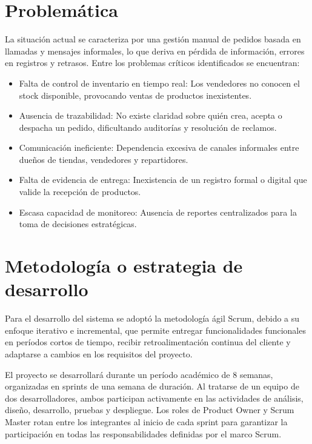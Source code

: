 \documentclass[12pt,a4paper]{report}
\begin{document}
\section{Problemática}
La situación actual se caracteriza por una gestión manual de pedidos basada en llamadas y mensajes informales, lo que deriva en pérdida de información, errores en registros y retrasos. Entre los problemas críticos identificados se encuentran:
\begin{itemize}
\item Falta de control de inventario en tiempo real: Los vendedores no conocen el stock disponible, provocando ventas de productos inexistentes.

\item Ausencia de trazabilidad: No existe claridad sobre quién crea, acepta o despacha un pedido, dificultando auditorías y resolución de reclamos.

\item Comunicación ineficiente: Dependencia excesiva de canales informales entre dueños de tiendas, vendedores y repartidores.

\item Falta de evidencia de entrega: Inexistencia de un registro formal o digital que valide la recepción de productos.

\item Escasa capacidad de monitoreo: Ausencia de reportes centralizados para la toma de decisiones estratégicas.
\end{itemize}

\section{Metodología o estrategia de desarrollo}
Para el desarrollo del sistema se adoptó la metodología ágil Scrum, debido a su enfoque iterativo e incremental, que permite entregar funcionalidades funcionales en períodos cortos de tiempo, recibir retroalimentación continua del cliente y adaptarse a cambios en los requisitos del proyecto.

El proyecto se desarrollará durante un período académico de 8 semanas, organizadas en sprints de una semana de duración. Al tratarse de un equipo de dos desarrolladores, ambos participan activamente en las actividades de análisis, diseño, desarrollo, pruebas y despliegue. Los roles de Product Owner y Scrum Master rotan entre los integrantes al inicio de cada sprint para garantizar la participación en todas las responsabilidades definidas por el marco Scrum.
\end{document}

